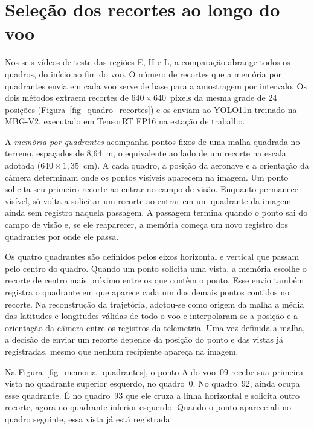 \section{Seleção dos recortes ao longo do voo}
\label{sec_sim_estrategias}
\label{sec_metodo_quadrantes}

Nos seis vídeos de teste das regiões E, H e L, a comparação abrange todos os quadros, do início ao fim do voo. O número de recortes que a memória por quadrantes envia em cada voo serve de base para a amostragem por intervalo. Os dois métodos extraem recortes de $640\times640$~pixels da mesma grade de 24 posições (Figura~\ref{fig_quadro_recortes}) e os enviam ao YOLO11n treinado na MBG-V2, executado em TensorRT FP16 na estação de trabalho.

A \emph{memória por quadrantes} acompanha pontos fixos de uma malha quadrada no terreno, espaçados de 8,64~m, o equivalente ao lado de um recorte na escala adotada ($640\times1{,}35$~cm). A cada quadro, a posição da aeronave e a orientação da câmera determinam onde os pontos visíveis aparecem na imagem. Um ponto solicita seu primeiro recorte ao entrar no campo de visão. Enquanto permanece visível, só volta a solicitar um recorte ao entrar em um quadrante da imagem ainda sem registro naquela passagem. A passagem termina quando o ponto sai do campo de visão e, se ele reaparecer, a memória começa um novo registro dos quadrantes por onde ele passa.

Os quatro quadrantes são definidos pelos eixos horizontal e vertical que passam pelo centro do quadro. Quando um ponto solicita uma vista, a memória escolhe o recorte de centro mais próximo entre os que contêm o ponto. Esse envio também registra o quadrante em que aparece cada um dos demais pontos contidos no recorte. Na reconstrução da trajetória, adotou-se como origem da malha a média das latitudes e longitudes válidas de todo o voo e interpolaram-se a posição e a orientação da câmera entre os registros da telemetria. Uma vez definida a malha, a decisão de enviar um recorte depende da posição do ponto e das vistas já registradas, mesmo que nenhum recipiente apareça na imagem.

Na Figura~\ref{fig_memoria_quadrantes}, o ponto A do voo~09 recebe sua primeira vista no quadrante superior esquerdo, no quadro~0. No quadro~92, ainda ocupa esse quadrante. É no quadro~93 que ele cruza a linha horizontal e solicita outro recorte, agora no quadrante inferior esquerdo. Quando o ponto aparece ali no quadro seguinte, essa vista já está registrada.

